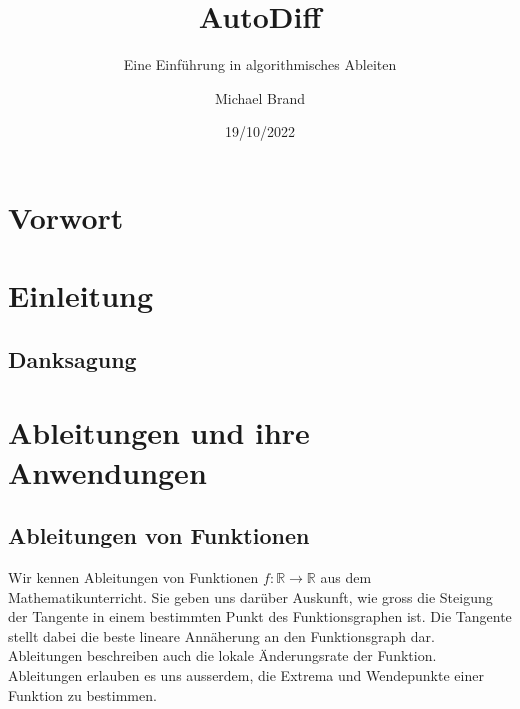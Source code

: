 \documentclass[
  letterpaper,
  DIV=11,
  oneside]{scrreprt}
\title{AutoDiff}
\subtitle{Eine Einführung in algorithmisches Ableiten}
\author{Michael Brand}
\date{19/10/2022}
\renewcommand*\contentsname{Inhaltsverzeichnis}
\newcommand\contentsname{Inhaltsverzeichnis}
\theoremstyle{definition}
\theoremstyle{definition}
\theoremstyle{remark}
\begin{document}
\maketitle
\ifdefined\Shaded\renewenvironment{Shaded}{\begin{tcolorbox}[borderline west={3pt}{0pt}{shadecolor}, frame hidden, boxrule=0pt, enhanced, breakable, interior hidden, sharp corners]}{\end{tcolorbox}}\fi

\renewcommand*\contentsname{Inhaltsverzeichnis}
{
\hypersetup{linkcolor=}
\setcounter{tocdepth}{2}
\tableofcontents
}

\hypertarget{vorwort}{%
\chapter*{Vorwort}\label{vorwort}}


\hypertarget{einleitung}{%
\chapter*{Einleitung}\label{einleitung}}

\hypertarget{danksagung}{%
\section*{Danksagung}\label{danksagung}}


\hypertarget{ableitungen-und-ihre-anwendungen}{%
\chapter{Ableitungen und ihre
Anwendungen}\label{ableitungen-und-ihre-anwendungen}}

\hypertarget{ableitungen-von-funktionen}{%
\section{Ableitungen von Funktionen}\label{ableitungen-von-funktionen}}

Wir kennen Ableitungen von Funktionen
\(f: \mathbb{R}\rightarrow\mathbb{R}\) aus dem Mathematikunterricht. Sie
geben uns darüber Auskunft, wie gross die Steigung der Tangente in einem
bestimmten Punkt des Funktionsgraphen ist. Die Tangente stellt dabei die
beste lineare Annäherung an den Funktionsgraph dar. Ableitungen
beschreiben auch die lokale Änderungsrate der Funktion. Ableitungen
erlauben es uns ausserdem, die Extrema und Wendepunkte einer Funktion zu
bestimmen.
\end{document}
